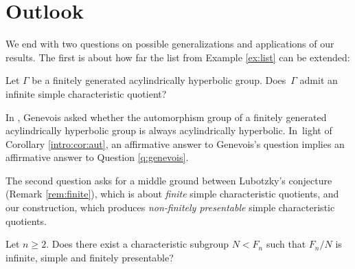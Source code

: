 \section{Outlook}

We end with two questions on possible generalizations and applications of our results. The first is about how far the list from Example \ref{ex:list} can be extended:

\begin{question}
\label{q:genevois}
Let $\Gamma$ be a finitely generated acylindrically hyperbolic group. Does~$\Gamma$ admit an infinite simple characteristic quotient?
\end{question}

In \cite[Quest.\,1.1]{auto:oneend}, Genevois asked whether the automorphism group of a finitely generated acylindrically hyperbolic group is always acylindrically hyperbolic. In~light of Corollary \ref{intro:cor:aut}, an affirmative answer to Genevois's question implies an affirmative answer to Question \ref{q:genevois}.

The second question asks for a middle ground between Lubotzky's conjecture (Remark \ref{rem:finite}), which is about \emph{finite} simple characteristic quotients, and our construction, which produces \emph{non-finitely presentable} simple characteristic quotients.

\begin{question}
Let $n \geq 2$. Does there exist a characteristic subgroup $N < F_n$ such that $F_n / N$ is infinite, simple and finitely presentable?
\end{question}
